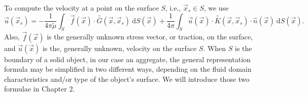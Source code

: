 To compute the velocity at a point on the surface $S$, i.e., $ \vec{x}_s \in S$, we use 
\begin{equation}
   \vec{u}(\vec{x}_s) = - \frac{1}{4 \pi {\tilde{\mu}}} \int_S  \vec{f}(\vec{x}) \cdot \bar{\bar{G}}(\vec{x},\vec{x}_s) \ \text{d}S(\vec{x}) 
+ \frac{1}{4 \pi} 
\int_S
\vec{u}(\vec{x}) \cdot  \bar{\bar{K}}(\vec{x},\vec{x}_s)  
\cdot \hat{n} ( \vec{x})
\ \text{d}S(\vec{x}).
\label{eq_BIE_onS}
\end{equation}
Also, $\vec{f}(\vec{x})$ is the generally unknown stress vector, or traction, on the surface, and $\vec{u}(\vec{x})$ is the, generally unknown, velocity on the surface $S$. 
When $S$ is the boundary of a solid object, in our case an aggregate, the general representation formula may be simplified in two different ways, depending on the fluid domain characteristics and/or type of the object's surface. We will introduce those two formulae in Chapter 2. 


